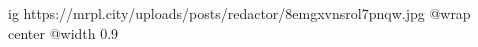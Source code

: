  
 
 
 
 

\ifcmt
  ig https://mrpl.city/uploads/posts/redactor/8emgxvnsrol7pnqw.jpg
  @wrap center
  @width 0.9
\fi
